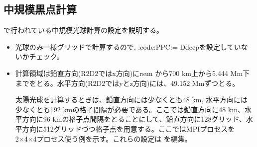 \documentclass[letterpaper,10pt,dvipdfmx,report]{sphinxmanual}
\begin{document}
\subsection{中規模黒点計算}
\label{\detokenize{typical_case:id6}}
\sphinxAtStartPar
{} で行われている中規模光球計算の設定を説明する。
\begin{itemize}
\item {} \begin{description}
\sphinxAtStartPar
光球のみ一様グリッドで計算するので, :code:{\color{red}\bfseries{}\textasciigrave{}}PPC:= \sphinxhyphen{}Ddeep\textasciigrave{}を設定していないかチェック。

\end{description}

\item {} \begin{description}
\sphinxAtStartPar
計算領域は鉛直方向(R2D2ではx方向)にrsun から700 km上から5.444 Mm下までをとる。水平方向(R2D2ではyとz方向)には、49.152 Mmずつとる。

\sphinxAtStartPar
太陽光球を計算するときは、鉛直方向には少なくとも48 km, 水平方向には少なくとも192 kmの格子間隔が必要である。ここでは鉛直方向に48 km、水平方向に96 kmの格子点間隔をとることにして、鉛直方向に128グリッド、水平方向に512グリッドづつ格子点を用意する。ここではMPIプロセスを2×4×4プロセス使う例を示す。これらの設定は  を編集。

\begin{sphinxVerbatim}[commandchars=\\\{\}]


\end{sphinxVerbatim}
\end{description}
\end{itemize}
\end{document}
